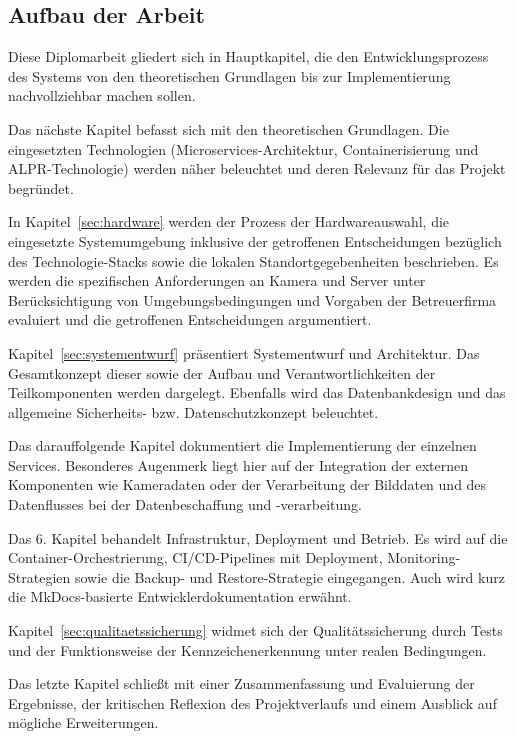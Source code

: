 \newpage
\subsection{Aufbau der Arbeit}
\label{sec:aufbau}

Diese Diplomarbeit gliedert sich in Hauptkapitel, die den Entwicklungsprozess des Systems von den theoretischen Grundlagen bis zur Implementierung nachvollziehbar machen sollen.

Das nächste Kapitel befasst sich mit den theoretischen Grundlagen. Die eingesetzten Technologien (Microservices-Architektur, Containerisierung und ALPR-Technologie) werden näher beleuchtet und deren Relevanz für das Projekt begründet.

In Kapitel~\ref{sec:hardware} werden der Prozess der Hardwareauswahl, die eingesetzte Systemumgebung inklusive der getroffenen Entscheidungen bezüglich des Technologie-Stacks sowie die lokalen Standortgegebenheiten beschrieben.
Es werden die spezifischen Anforderungen an Kamera und Server unter Berücksichtigung von Umgebungsbedingungen und Vorgaben der Betreuerfirma evaluiert und die getroffenen Entscheidungen argumentiert.

Kapitel~\ref{sec:systementwurf} präsentiert Systementwurf und Architektur. Das Gesamtkonzept dieser sowie der Aufbau und Verantwortlichkeiten der Teilkomponenten werden dargelegt. Ebenfalls wird das Datenbankdesign und das allgemeine Sicherheits- bzw. Datenschutzkonzept beleuchtet.

Das darauffolgende Kapitel dokumentiert die Implementierung der einzelnen Services. Besonderes Augenmerk liegt hier auf der Integration der externen Komponenten wie Kameradaten oder der Verarbeitung der Bilddaten und des Datenflusses bei der Datenbeschaffung und -verarbeitung.

Das 6. Kapitel behandelt Infrastruktur, Deployment und Betrieb. Es wird auf die Container-Orchestrierung, CI/CD-Pipelines mit Deployment, Monitoring-Strategien sowie die Backup- und Restore-Strategie eingegangen. Auch wird kurz die MkDocs-basierte Entwicklerdokumentation erwähnt.

Kapitel~\ref{sec:qualitaetssicherung} widmet sich der Qualitätssicherung durch Tests und der Funktionsweise der Kennzeichenerkennung unter realen Bedingungen.

Das letzte Kapitel schließt mit einer Zusammenfassung und Evaluierung der Ergebnisse, der kritischen Reflexion des Projektverlaufs und einem Ausblick auf mögliche Erweiterungen.
